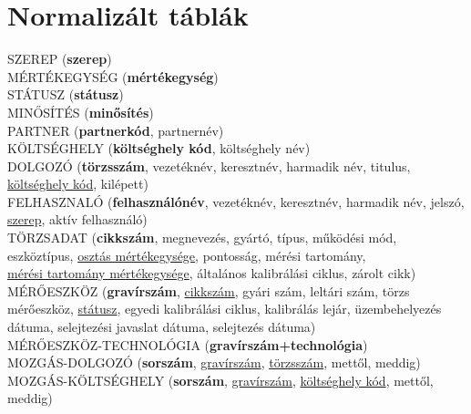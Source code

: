 \documentclass[a4paper,12pt]{report}
\newcommand{\pk}[1]{\textbf{#1}} %
\newcommand{\fk}[1]{\underline{#1}} %
\newcommand{\tabla}[1]{\noindent\MakeUppercase{#1}} %
\begin{document}
\section{Normalizált táblák}
%

\tabla{szerep} (\pk{szerep})\\

\tabla{mértékegység} (\pk{mértékegység})\\

\tabla{státusz} (\pk{státusz})\\

\tabla{minősítés} (\pk{minősítés})\\

\tabla{partner} (\pk{partnerkód}, partnernév)\\

\tabla{költséghely} (\pk{költséghely kód}, költséghely név)\\

\tabla{dolgozó} (\pk{törzsszám}, vezetéknév, keresztnév, harmadik név,
 titulus,\\ \fk{költséghely kód}, kilépett)\\
 
\tabla{felhasznaló} (\pk{felhasználónév}, vezetéknév, keresztnév, harmadik név, jelszó,
\fk{szerep}, aktív felhasználó)\\

\tabla{törzsadat} (\pk{cikkszám}, megnevezés, gyártó, típus, működési mód, eszköztípus,
\fk{osztás mértékegysége}, pontosság, mérési tartomány, \\
\fk{mérési tartomány mértékegysége}, általános kalibrálási ciklus, zárolt cikk)\\

\tabla{mérőeszköz} (\pk{gravírszám}, \fk{cikkszám}, gyári szám, leltári szám,
törzs mérőeszköz, \fk{státusz}, egyedi kalibrálási ciklus, kalibrálás lejár, üzembehelyezés
dátuma, selejtezési javaslat dátuma, selejtezés dátuma)\\

\tabla{mérőeszköz-technológia} (\pk{gravírszám+technológia})\\

\tabla{mozgás-dolgozó} (\pk{sorszám}, \fk{gravírszám}, \fk{törzsszám}, mettől, meddig)\\

\tabla{mozgás-költséghely} (\pk{sorszám}, \fk{gravírszám}, \fk{költséghely kód}, mettől,
meddig)\\
\end{document}
